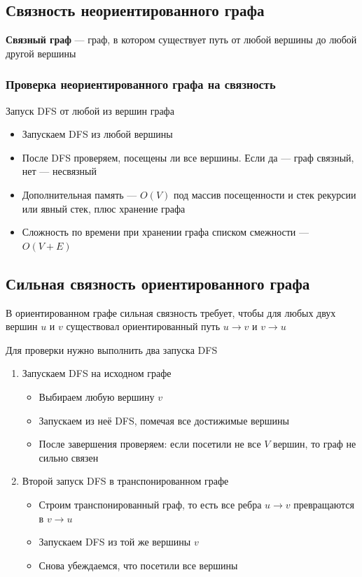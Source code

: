 \documentclass[a4paper]{article}
\begin{document}
\subsection{Связность неориентированного графа}
\textbf{Связный граф} — граф, в котором существует путь от любой вершины до любой другой вершины

\subsubsection*{Проверка неориентированного графа на связность}
Запуск DFS от любой из вершин графа

\begin{itemize}
    \item Запускаем DFS из любой вершины
    \item После DFS проверяем, посещены ли все вершины. Если да — граф связный, нет — несвязный
    \item Дополнительная память — $O(V)$ под массив посещенности и стек рекурсии или явный стек, плюс хранение графа
    \item Сложность по времени при хранении графа списком смежности — $O(V+E)$
\end{itemize}

\subsection{Сильная связность ориентированного графа}
 В ориентированном графе сильная связность требует, чтобы для любых двух вершин $u$ и $v$ существовал ориентированный путь $u\rightarrow v$ и $v\rightarrow u$

Для проверки нужно выполнить два запуска DFS

\begin{enumerate}
    \item Запускаем DFS на исходном графе
    \begin{itemize}
        \item Выбираем любую вершину $v$
        \item Запускаем из неё DFS, помечая все достижимые вершины
        \item После завершения проверяем: если посетили не все $V$ вершин, то граф не сильно связен
    \end{itemize}
    \item Второй запуск DFS в транспонированном графе
    \begin{itemize}
        \item Строим транспонированный граф, то есть все ребра $u\rightarrow v$ превращаются в $v\rightarrow u$
        \item Запускаем DFS из той же вершины $v$
        \item Снова убеждаемся, что посетили все вершины
    \end{itemize}
\end{enumerate}
\end{document}
